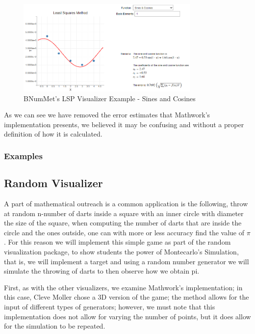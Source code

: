 \begin{figure}[H]
    \centering
    \includegraphics[width=0.8\textwidth]{Include/Images/Thesis/Development/Visualizers/LSP/BNumMet.LSP.Ex1.3.png}
    \caption{BNumMet's LSP Visualizer Example - Sines and Cosines}
    \label{fig:BNumMet's Least Squares Visualizer Example- Sines and Cosines}
\end{figure}
As we can see we have removed the error estimates that Mathwork's implementation presents, we believed it may be confusing and without a proper definition of how it is calculated.
\subsubsection{Examples}
	

\subsection{Random Visualizer}
A part of mathematical outreach is a common application is the following, throw at random n-number of darts inside a square with an inner circle with diameter the size of the square, when computing the number of darts that are inside the circle and the ones outside, one can with more or less accuracy find the value of $\pi$. For this reason we will implement this simple game as part of the random visualization package, to show students the power of Montecarlo's Simulation, that is, we will implement a target and using a random number generator we will simulate the throwing of darts to then observe how we obtain pi.

First, as with the other visualizers, we examine Mathwork's implementation; in this case, Cleve Moller chose a 3D version of the game; the method allows for the input of different types of generators; however, we must note that this implementation does not allow for varying the number of points, but it does allow for the simulation to be repeated.

